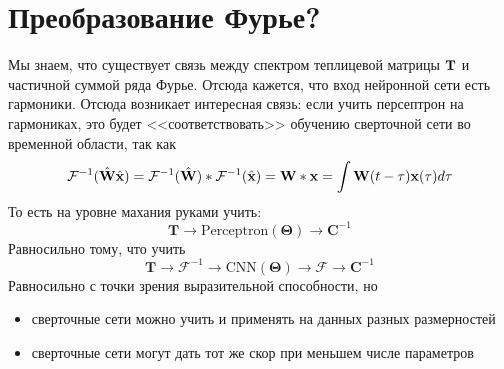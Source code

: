 \documentclass[a4paper, 12pt]{article}
\begin{document}
\section{Преобразование Фурье?}

Мы знаем, что существует связь между
спектром теплицевой матрицы $\textbf T$ и частичной суммой ряда Фурье.
Отсюда кажется, что вход нейронной сети есть 
гармоники. Отсюда
возникает интересная связь:
если учить персептрон на гармониках, это
будет <<соответствовать>> обучению сверточной сети во временной области, так
как
\[
    \mathcal F^{-1}(\hat{\textbf{W}}\hat{\textbf{x}})
    =
    \mathcal F^{-1}(\hat{\textbf{W}}) * \mathcal F^{-1}(\hat{\textbf{x}})
    =
    \textbf W * \textbf x
    =
    \int \textbf W(t-\tau)\textbf x(\tau) d\tau
\]
То есть на уровне махания руками учить:
\[
    \textbf{T}\to \mathrm{Perceptron}(\boldsymbol\Theta) \to \textbf{C}^{-1}
\]
Равносильно тому, что учить
\[
    \textbf{T}\to\mathcal F^{-1}\to\mathrm{CNN}(\boldsymbol \Theta) 
    \to\mathcal F\to \textbf{C}^{-1}
\]
Равносильно с точки зрения выразительной способности,
но 
\begin{itemize}
    \item сверточные сети можно учить и применять на данных
        разных размерностей
    \item сверточные сети могут дать тот же скор при меньшем числе параметров
\end{itemize}
\end{document}
